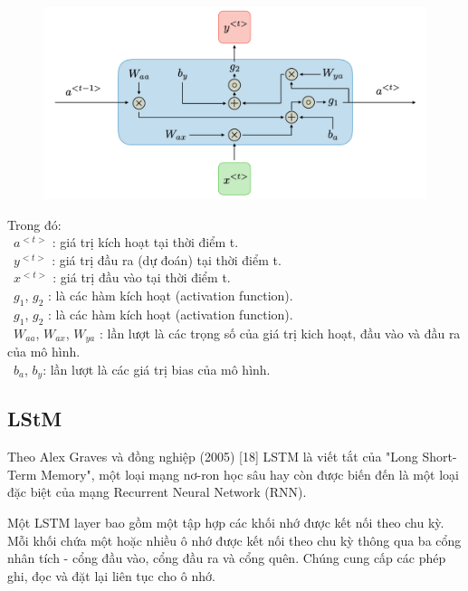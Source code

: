 \documentclass[conference]{IEEEtran}
\begin{document}
\begin{figure}[H]
    \centering
    \begin{minipage}{0.5\textwidth}
    \centering
    \includegraphics[width=1\textwidth]{Image/RNN2.png}
    \label{fig:1}
    \end{minipage}
\end{figure}
Trong đó:\\
	\indent\textbullet\ \(a^{<t>}\) : giá trị kích hoạt tại thời điểm t. \\
	\indent\textbullet\ \(y^{<t>}\) : giá trị đầu ra (dự đoán) tại thời điểm t. \\
 	\indent\textbullet\ \(x^{<t>}\) : giá trị đầu vào tại thời điểm t. \\
 	\indent\textbullet\ \(g_1\), \(g_2\) : là các hàm kích hoạt (activation function). \\
 	\indent\textbullet\ \(g_1\), \(g_2\) : là các hàm kích hoạt (activation function). \\
   	\indent\textbullet\ \(W_{aa}\), \(W_{ax}\), \(W_{ya}\) : lần lượt là các trọng số của giá trị kich hoạt, đầu vào và đầu ra của mô hình. \\
   	\indent\textbullet\ \(b_a\), \(b_y\): lần lượt là các giá trị bias của mô hình. \\
\subsection{LStM}
Theo Alex Graves và đồng nghiệp (2005) [18] LSTM là viết tắt của "Long Short-Term Memory", một loại mạng nơ-ron học sâu hay còn được biến đến là một loại đặc biệt của mạng Recurrent Neural Network (RNN).

Một LSTM layer bao gồm một tập hợp các khối nhớ được kết nối theo chu kỳ. Mỗi khối chứa một hoặc nhiều ô nhớ được kết nối theo chu kỳ thông qua ba cổng nhân tích - cổng đầu vào, cổng đầu ra và cổng quên. Chúng cung cấp các phép ghi, đọc và đặt lại liên tục cho ô nhớ.
\end{document}
